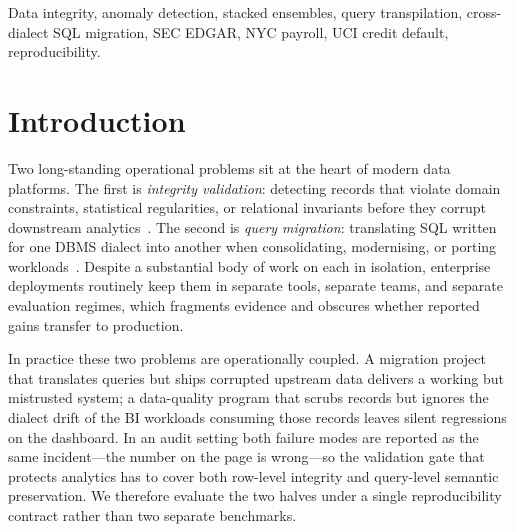 \documentclass{ieeeaccess}
\begin{document}
\begin{keywords}
Data integrity, anomaly detection, stacked ensembles, query transpilation, cross-dialect SQL migration,
SEC EDGAR, NYC payroll, UCI credit default, reproducibility.
\end{keywords}

\titlepgskip=-15pt
\maketitle

\section{Introduction}
\label{sec:intro}

Two long-standing operational problems sit at the heart of modern data platforms. The first is \emph{integrity
validation}: detecting records that violate domain constraints, statistical regularities, or relational invariants
before they corrupt downstream analytics~\cite{redman1998impact,wang1996beyond,pipino2002data,batini2009methodologies,
abedjan2016detecting}. The second is \emph{query migration}: translating SQL written for one DBMS dialect into
another when consolidating, modernising, or porting workloads~\cite{leis2015whatare}. Despite a substantial body of
work on each in isolation, enterprise deployments routinely keep them in separate tools, separate teams, and
separate evaluation regimes, which fragments evidence and obscures whether reported gains transfer to production.

In practice these two problems are operationally coupled. A migration project that translates queries but ships
corrupted upstream data delivers a working but mistrusted system; a data-quality program that scrubs records but
ignores the dialect drift of the BI workloads consuming those records leaves silent regressions on the dashboard.
In an audit setting both failure modes are reported as the same incident---the number on the page is wrong---so
the validation gate that protects analytics has to cover both row-level integrity and query-level semantic
preservation. We therefore evaluate the two halves under a single reproducibility contract rather than two
separate benchmarks.
\end{document}
